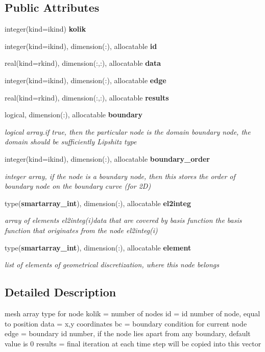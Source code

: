 \subsection*{Public Attributes}
\begin{DoxyCompactItemize}
\item 
integer(kind=ikind) {\bf kolik}
\item 
integer(kind=ikind), dimension(\+:), allocatable {\bf id}
\item 
real(kind=rkind), dimension(\+:,\+:), allocatable {\bf data}
\item 
integer(kind=ikind), dimension(\+:), allocatable {\bf edge}
\item 
real(kind=rkind), dimension(\+:,\+:), allocatable {\bf results}
\item 
logical, dimension(\+:), allocatable {\bf boundary}
\begin{DoxyCompactList}\small\item\em logical array.\+if true, then the particular node is the domain boundary node, the domain should be sufficiently Lipshitz type \end{DoxyCompactList}\item 
integer(kind=ikind), dimension(\+:), allocatable {\bf boundary\+\_\+order}
\begin{DoxyCompactList}\small\item\em integer array, if the node is a boundary node, then this stores the order of boundary node on the boundary curve (for 2D) \end{DoxyCompactList}\item 
type({\bf smartarray\+\_\+int}), dimension(\+:), allocatable {\bf el2integ}
\begin{DoxyCompactList}\small\item\em array of elements el2integ(i)data that are covered by basis function the basis function that originates from the node el2integ(i) \end{DoxyCompactList}\item 
type({\bf smartarray\+\_\+int}), dimension(\+:), allocatable {\bf element}
\begin{DoxyCompactList}\small\item\em list of elements of geometrical discretization, where this node belongs \end{DoxyCompactList}\end{DoxyCompactItemize}


\subsection{Detailed Description}
mesh array type for node kolik = number of nodes id = id number of node, equal to position data = x,y coordinates bc = boundary condition for current node edge = boundary id number, if the node lies apart from any boundary, default value is 0 results = final iteration at each time step will be copied into this vector 

